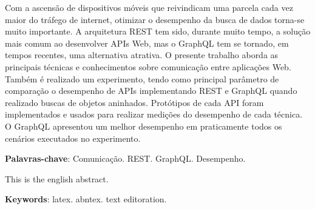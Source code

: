 \setlength{\absparsep}{18pt} %
\begin{resumo}

    Com a ascensão de dispositivos móveis que reivindicam uma parcela cada vez maior do tráfego de internet, otimizar o desempenho da busca de dados torna-se muito importante. A arquitetura REST tem sido, durante muito tempo, a solução mais comum ao desenvolver APIs Web, mas o GraphQL tem se tornado, em tempos recentes, uma alternativa atrativa. O presente trabalho aborda as principais técnicas e conhecimentos sobre comunicação entre aplicações Web. Também é realizado um experimento, tendo como principal parâmetro de comparação o desempenho de APIs implementando REST e GraphQL quando realizado buscas de objetos aninhados. Protótipos de cada API foram implementados e usados para realizar medições do desempenho de cada técnica. O GraphQL apresentou um melhor desempenho em praticamente todos os cenários executados no experimento.

\textbf{Palavras-chave}: Comunicação. REST. GraphQL. Desempenho.

\end{resumo}

\begin{resumo}[Abstract]
 
   This is the english abstract.

   \vspace{\onelineskip}
 
   \noindent 
   \textbf{Keywords}: latex. abntex. text editoration.
 
\end{resumo}
